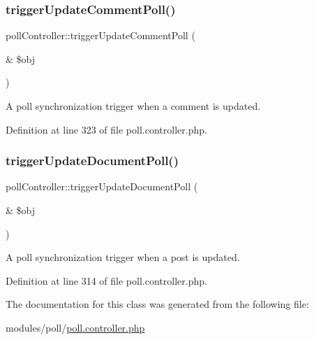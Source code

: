 \mbox{\label{classpollController_a2f3da10fbc7dc8bf7dddaf0e81e152ab}} 
\subsubsection{\texorpdfstring{trigger\+Update\+Comment\+Poll()}{triggerUpdateCommentPoll()}}
{\footnotesize\ttfamily poll\+Controller\+::trigger\+Update\+Comment\+Poll (\begin{DoxyParamCaption}\item[{\&}]{\$obj }\end{DoxyParamCaption})}



A poll synchronization trigger when a comment is updated. 



Definition at line 323 of file poll.\+controller.\+php.

\mbox{\label{classpollController_a20c5267c985ebf4484a61b238850f0c5}} 
\subsubsection{\texorpdfstring{trigger\+Update\+Document\+Poll()}{triggerUpdateDocumentPoll()}}
{\footnotesize\ttfamily poll\+Controller\+::trigger\+Update\+Document\+Poll (\begin{DoxyParamCaption}\item[{\&}]{\$obj }\end{DoxyParamCaption})}



A poll synchronization trigger when a post is updated. 



Definition at line 314 of file poll.\+controller.\+php.



The documentation for this class was generated from the following file\+:\begin{DoxyCompactItemize}
\item 
modules/poll/\hyperlink{poll_8controller_8php}{poll.\+controller.\+php}\end{DoxyCompactItemize}
